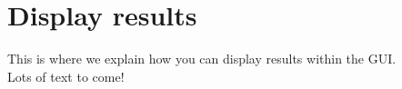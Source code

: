 
\chapter{Display results}
\minitoc

This is where we explain how you can display results within the GUI. \\
Lots of text to come!